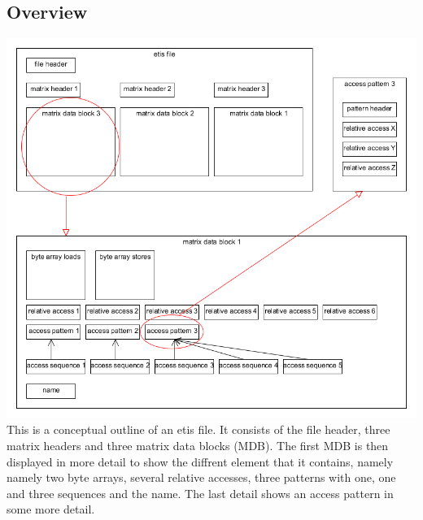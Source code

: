 \subsection{Overview}
\includegraphics[width=\textwidth]{fileformat/structure}
This is a conceptual outline of an etis file. It consists of the file header, three matrix headers and three matrix data blocks (MDB). The first MDB is then displayed in more detail to show the diffrent element
that it contains, namely namely two byte arrays, several relative accesses, three patterns with one, one and three sequences and the name. The last detail shows an access pattern in some more detail.